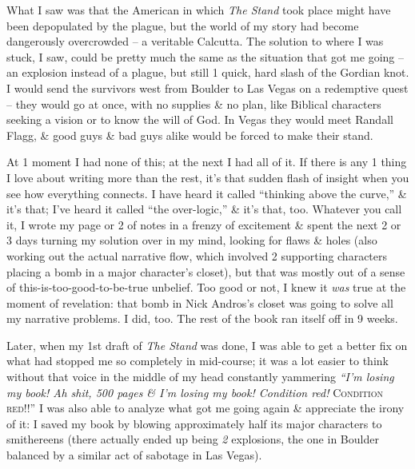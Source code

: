 \documentclass{article}
\numberwithin{equation}{section}
\begin{document}
What I saw was that the American in which \textit{The Stand} took place might have been depopulated by the plague, but the world of my story had become dangerously overcrowded -- a veritable Calcutta. The solution to where I was stuck, I saw, could be pretty much the same as the situation that got me going -- an explosion instead of a plague, but still 1 quick, hard slash of the Gordian knot. I would send the survivors west from Boulder to Las Vegas on a redemptive quest -- they would go at once, with no supplies \& no plan, like Biblical characters seeking a vision or to know the will of God. In Vegas they would meet Randall Flagg, \& good guys \& bad guys alike would be forced to make their stand.

At 1 moment I had none of this; at the next I had all of it. If there is any 1 thing I love about writing more than the rest, it's that sudden flash of insight when you see how everything connects. I have heard it called ``thinking above the curve,'' \& it's that; I've heard it called ``the over-logic,'' \& it's that, too. Whatever you call it, I wrote my page or 2 of notes in a frenzy of excitement \& spent the next 2 or 3 days turning my solution over in my mind, looking for flaws \& holes (also working out the actual narrative flow, which involved 2 supporting characters placing a bomb in a major character's closet), but that was mostly out of a sense of this-is-too-good-to-be-true unbelief. Too good or not, I knew it \textit{was} true at the moment of revelation: that bomb in Nick Andros's closet was going to solve all my narrative problems. I did, too. The rest of the book ran itself off in 9 weeks.

Later, when my 1st draft of \textit{The Stand} was done, I was able to get a better fix on what had stopped me so completely in mid-course; it was a lot easier to think without that voice in the middle of my head constantly yammering \textit{``I'm losing my book! Ah shit, 500 pages \& I'm losing my book! Condition red!} \textsc{Condition red!!}'' I was also able to analyze what got me going again \& appreciate the irony of it: I saved my book by blowing approximately half its major characters to smithereens (there actually ended up being \textit{2} explosions, the one in Boulder balanced by a similar act of sabotage in Las Vegas).
\end{document}
